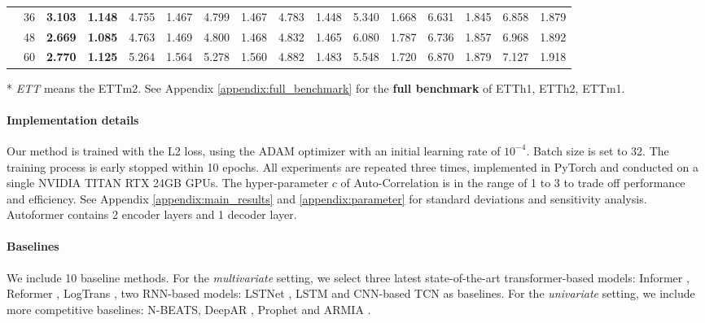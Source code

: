 \begin{table}[tbp]
\begin{threeparttable}
\begin{small}
\begin{tabular}{c|c|cccccccccccccc}
    & 36   & \textbf{3.103} & \textbf{1.148} & 4.755 & 1.467 & 4.799 & 1.467 & 4.783 & 1.448 & 5.340 & 1.668 & 6.631 & 1.845 & 6.858 & 1.879  \\
    & 48   & \textbf{2.669} & \textbf{1.085} & 4.763 & 1.469 & 4.800 & 1.468 & 4.832 & 1.465 & 6.080 & 1.787 & 6.736 & 1.857 & 6.968 & 1.892  \\
    & 60   & \textbf{2.770} & \textbf{1.125} & 5.264 & 1.564 & 5.278 & 1.560 & 4.882 & 1.483 & 5.548 & 1.720 & 6.870 & 1.879 & 7.127 & 1.918  \\
    \bottomrule
  \end{tabular}
  
  \end{small}
   \begin{tablenotes}
        \footnotesize
        \item[*] \emph{ETT} means the ETTm2. See Appendix \ref{appendix:full_benchmark} for the \textbf{full benchmark} of ETTh1, ETTh2, ETTm1.
  \end{tablenotes}
  \end{threeparttable}
  \vspace{-15pt}
\end{table}

\vspace{-5pt}
\paragraph{Implementation details}\label{Implementation}
Our method is trained with the L2 loss, using the ADAM \cite{DBLP:journals/corr/KingmaB14} optimizer with an initial learning rate of $10^{-4}$. Batch size is set to 32. The training process is early stopped within 10 epochs. All experiments are repeated three times, implemented in PyTorch \cite{Paszke2019PyTorchAI} and conducted on a single NVIDIA TITAN RTX 24GB GPUs.
The hyper-parameter $c$ of Auto-Correlation is in the range of 1 to 3 to trade off performance and efficiency. See Appendix \ref{appendix:main_results} and \ref{appendix:parameter} for standard deviations and sensitivity analysis.
Autoformer contains 2 encoder layers and 1 decoder layer. 

\vspace{-5pt}
\paragraph{Baselines} We include 10 baseline methods. For the \emph{multivariate} setting, we select three latest state-of-the-art transformer-based models: Informer \cite{haoyietal-informer-2021}, Reformer \cite{kitaev2020reformer}, LogTrans \cite{2019Enhancing}, two RNN-based models: LSTNet \cite{2018Modeling}, LSTM \cite{Hochreiter1997LongSM} and CNN-based TCN \cite{Bai2018AnEE} as baselines. 
For the \emph{univariate} setting, we include more competitive baselines: N-BEATS\cite{oreshkin2019n}, DeepAR \cite{Flunkert2017DeepARPF}, Prophet \cite{Taylor2017ForecastingAS} and ARMIA \cite{Anderson1976TimeSeries2E}. 

